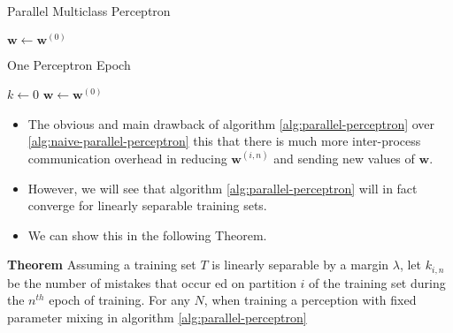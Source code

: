 \begin{algorithm}[ht!!!]
    \caption{Parallel Multiclass Perceptron}
    \label{alg:parallel-perceptron}
    \SetAlgoLined
    \BlankLine
    $\bm{w} \gets \bm{w}^{(0)}$\;
    \BlankLine
\end{algorithm}
\begin{algorithm}[ht!!!]
    \caption{One Perceptron Epoch}
    \label{alg:one-perceptron-epoch}
    \SetAlgoLined
    \BlankLine
    $k \gets 0$\;
    $\bm{w} \gets \bm{w}^{(0)}$\;
    \BlankLine
\end{algorithm}
\begin{itemize}
    \item The obvious and main drawback of algorithm \ref{alg:parallel-perceptron} over \ref{alg:naive-parallel-perceptron} this that there is much more inter-process communication overhead in reducing $\bm{w}^{(i,n)}$ and sending new values of $\bm{w}$.
    \item However, we will see that algorithm \ref{alg:parallel-perceptron} will in fact converge for linearly separable training sets.
    \item We can show this in the following Theorem.
\end{itemize}
{\bf Theorem} Assuming a training set $T$ is linearly separable by a margin $\lambda$, let $k_{i,n}$ be the number of mistakes that occur ed on partition $i$ of the training set during the $n^{th}$ epoch of training. For any $N$, when training a perception with fixed parameter mixing in algorithm \ref{alg:parallel-perceptron}
